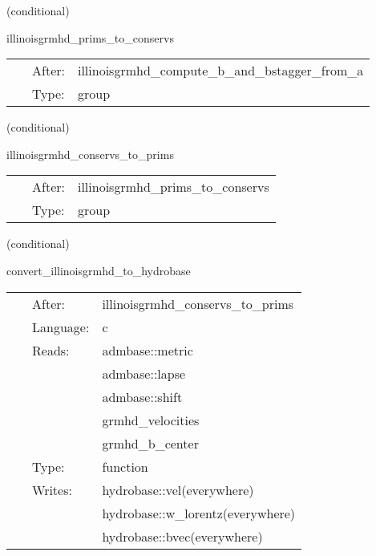 \documentclass{article}
\begin{document}
   (conditional) 

\hspace{5mm} illinoisgrmhd\_prims\_to\_conservs 

\hspace{5mm}{\it compute conservative variables from primitives } 


\hspace{5mm}

 \begin{tabular*}{160mm}{cll} 
~ & After:  & illinoisgrmhd\_compute\_b\_and\_bstagger\_from\_a \\ 
~ & Type:  & group \\ 
\end{tabular*} 


\vspace{5mm}

   (conditional) 

\hspace{5mm} illinoisgrmhd\_conservs\_to\_prims 

\hspace{5mm}{\it compute primitive variables from conservatives } 


\hspace{5mm}

 \begin{tabular*}{160mm}{cll} 
~ & After:  & illinoisgrmhd\_prims\_to\_conservs \\ 
~ & Type:  & group \\ 
\end{tabular*} 


\vspace{5mm}

   (conditional) 

\hspace{5mm} convert\_illinoisgrmhd\_to\_hydrobase 

\hspace{5mm}{\it convert illinoisgrmhd-native variables to hydrobase } 


\hspace{5mm}

 \begin{tabular*}{160mm}{cll} 
~ & After:  & illinoisgrmhd\_conservs\_to\_prims \\ 
~ & Language:  & c \\ 
~ & Reads:  & admbase::metric \\ 
~& ~ &admbase::lapse\\ 
~& ~ &admbase::shift\\ 
~& ~ &grmhd\_velocities\\ 
~& ~ &grmhd\_b\_center\\ 
~ & Type:  & function \\ 
~ & Writes:  & hydrobase::vel(everywhere) \\ 
~& ~ &hydrobase::w\_lorentz(everywhere)\\ 
~& ~ &hydrobase::bvec(everywhere)\\ 
\end{tabular*} 
\end{document}
